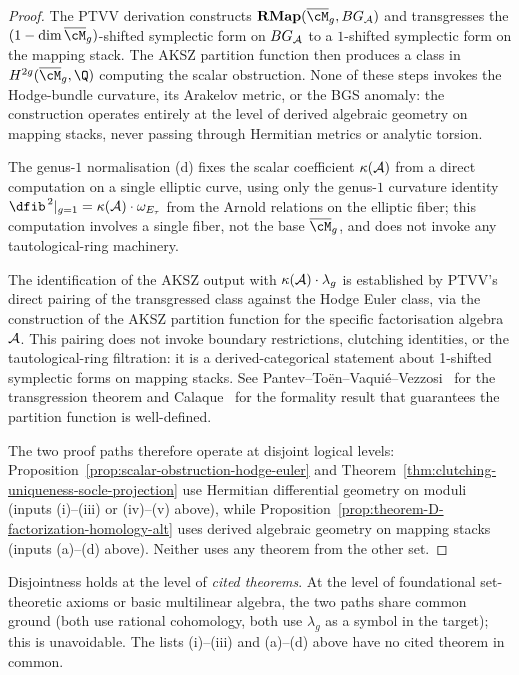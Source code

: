 \begin{proof}
The PTVV derivation constructs
$\mathbf{RMap}(\overline{\cM}_g, BG_\cA)$ and transgresses the
$(1-\dim\overline{\cM}_g)$-shifted symplectic form on $BG_{\mathcal{A}}$ to
a $1$-shifted symplectic form on the mapping stack. The AKSZ
partition function then produces a class in
$H^{2g}(\overline{\cM}_g,\Q)$ computing the scalar obstruction.
None of these steps invokes the Hodge-bundle curvature, its
Arakelov metric, or the BGS anomaly: the construction operates
entirely at the level of derived algebraic geometry on mapping
stacks, never passing through Hermitian metrics or analytic
torsion.

The genus-$1$ normalisation (d) fixes the scalar coefficient
$\kappa(\mathcal{A})$ from a direct computation on a single elliptic
curve, using only the genus-$1$ curvature identity
$\dfib^{\,2}|_{g=1} = \kappa(\cA)\cdot\omega_{E_\tau}$ from the
Arnold relations on the elliptic fiber; this computation involves
a single fiber, not the base $\overline{\cM}_g$, and does not
invoke any tautological-ring machinery.

The identification of the AKSZ output with $\kappa(\mathcal{A})\cdot\lambda_g$
is established by PTVV's direct pairing of the transgressed class
against the Hodge Euler class, via the construction of the AKSZ
partition function for the specific factorisation algebra~$\mathcal{A}$.
This pairing does not invoke boundary restrictions, clutching
identities, or the tautological-ring filtration: it is a
derived-categorical statement about 1-shifted symplectic forms on
mapping stacks. See Pantev--To\"en--Vaqui\'e--Vezzosi~\cite{PTVV13}
for the transgression theorem and Calaque~\cite{CalaqueFormality}
for the formality result that guarantees the partition function
is well-defined.

The two proof paths therefore operate at disjoint logical levels:
Proposition~\ref{prop:scalar-obstruction-hodge-euler} and
Theorem~\ref{thm:clutching-uniqueness-socle-projection} use
Hermitian differential geometry on moduli (inputs
(i)--(iii) or (iv)--(v) above), while
Proposition~\ref{prop:theorem-D-factorization-homology-alt}
uses derived algebraic geometry on mapping stacks (inputs
(a)--(d) above). Neither uses any theorem from the other set.
\end{proof}

\begin{remark}
\label{rem:disjointness-scope}
Disjointness holds at the level of \emph{cited theorems}.
At the level of foundational set-theoretic axioms or basic
multilinear algebra, the two paths share common ground (both use
rational cohomology, both use $\lambda_g$ as a symbol in the
target); this is unavoidable.  The lists (i)--(iii) and (a)--(d)
above have no cited theorem in common.
\end{remark}

